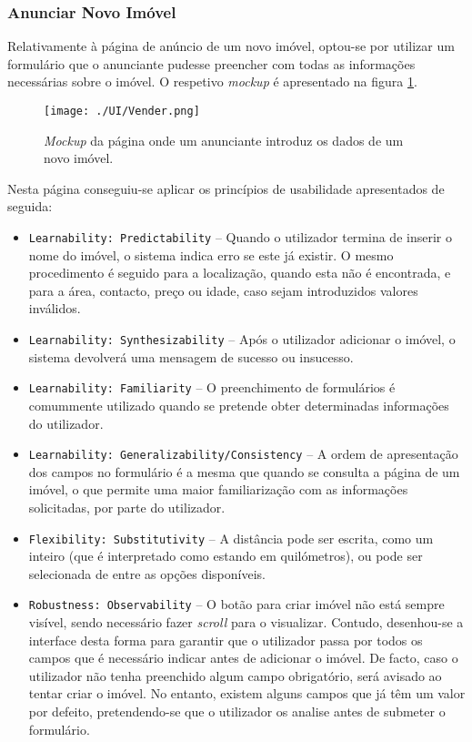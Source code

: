 \subsubsection{Anunciar Novo Imóvel}

Relativamente à página de anúncio de um novo imóvel, optou-se por utilizar um formulário que o anunciante pudesse preencher com todas as informações necessárias sobre o imóvel. O respetivo \textit{mockup} é apresentado na figura \ref{fig:announce}.
 
\begin{figure}[H]
    \centering
    \texttt{[image: ./UI/Vender.png]}
    \caption{\textit{Mockup} da página onde um anunciante introduz os dados de um novo imóvel.}
    \label{fig:announce}
\end{figure}

Nesta página conseguiu-se aplicar os princípios de usabilidade apresentados de seguida:

\begin{itemize}
    \item \texttt{Learnability: Predictability} -- Quando o utilizador termina de inserir o nome do imóvel, o sistema indica erro se este já existir. O mesmo procedimento é seguido para a localização, quando esta não é encontrada, e para a área, contacto, preço ou idade, caso sejam introduzidos valores inválidos.
    
    \item \texttt{Learnability: Synthesizability} -- Após o utilizador adicionar o imóvel, o sistema devolverá uma mensagem de sucesso ou insucesso.
    
    \item \texttt{Learnability: Familiarity} -- O preenchimento de formulários é comummente utilizado quando se pretende obter determinadas informações do utilizador.
    
    \item \texttt{Learnability: Generalizability/Consistency} -- A ordem de apresentação dos campos no formulário é a mesma que quando se consulta a página de um imóvel, o que permite uma maior familiarização com as informações solicitadas, por parte do utilizador.
    
    \item \texttt{Flexibility: Substitutivity} -- A distância pode ser escrita, como um inteiro (que é interpretado como estando em quilómetros), ou pode ser selecionada de entre as opções disponíveis.
    
    \item \texttt{Robustness: Observability} -- O botão para criar imóvel não está sempre visível, sendo necessário fazer \textit{scroll} para o visualizar. Contudo, desenhou-se a interface desta forma para garantir que o utilizador passa por todos os campos que é necessário indicar antes de adicionar o imóvel. De facto, caso o utilizador não tenha preenchido algum campo obrigatório, será avisado ao tentar criar o imóvel. No entanto, existem alguns campos que já têm um valor por defeito, pretendendo-se que o utilizador os analise antes de submeter o formulário.
\end{itemize}

